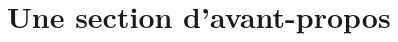 \documentclass{yathesis}
\begin{document}
\maketitle
\makedisclaimer
\makekeywords
\makelaboratory
%
\dedication{}
\makededications
%
\frontepigraph{}{}
\makefrontepigraphs
%

%
% 
%
\makeabstract
%
%
\printacronyms
\printsymbols[style=yatsymbolstyle]
%
\foreword
\section{Une section d'avant-propos}
\lipsum[30-45]
\end{document}
